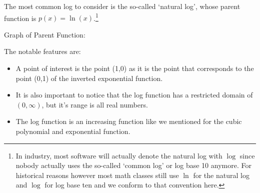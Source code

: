 \documentclass{ximeraXloud}
\begin{document}
        \begin{description}
            \item[Parent Function:] The most common log to consider is the so-called `natural log', whose parent function is $p(x) = \ln(x)$.\footnote{In industry, most software will actually denote the natural log with $\log$ since nobody actually uses the so-called `common log' or log base 10 anymore. For historical reasons however most math classes still use $\ln$ for the natural log and $\log$ for log base ten and we conform to that convention here.}\\
            \begin{minipage}{\textwidth}\item[Graph of Parent Function:]\hspace*{0pt} \\
                \begin{center}
                \end{center}
            \end{minipage}
            
            \item[Notable Features of Graph:] The notable features are:
            \begin{itemize}
                \item A point of interest is the point (1,0) as it is the point that corresponds to the point (0,1) of the inverted exponential function.
                \item It is also important to notice that the log function has a restricted domain of $(0,\infty)$, but it's range is all real numbers.
                \item The log function is an increasing function like we mentioned for the cubic polynomial and exponential function.
            \end{itemize}
            

\end{description}
\end{document}
